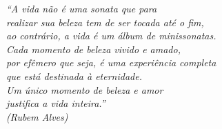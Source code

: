 \begin{epigrafe}
    \vspace*{\fill}
	\begin{flushright}
		\textit{``A vida não é uma sonata que para \\
		realizar sua beleza tem de ser tocada até o fim,  \\
		ao contrário, a vida é um álbum de minissonatas.  \\
		Cada momento de beleza vivido e amado,  \\
		por efêmero que seja, é uma experiência completa  \\
		que está destinada à eternidade.\\
		Um único momento de beleza e amor  \\
		justifica a vida inteira.'' \\
		(Rubem Alves)}
	\end{flushright}
\end{epigrafe}
